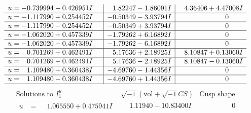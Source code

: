 \documentclass[1p]{elsarticle_modified}
\theoremstyle{definition}
\newcommand{\I}{\sqrt{-1}}
\begin{document}
$$\begin{array}{c|c|c}
\begin{aligned}
u &= -0.739994 - 0.426951 I\end{aligned}
 & \phantom{-}1.82247 - 1.86091 I & \phantom{-}4.36406 + 4.47008 I \\ \hline\begin{aligned}
u &= -1.117990 + 0.254452 I\end{aligned}
 & -0.50349 - 3.93794 I & \phantom{-0.000000 } 0 \\ \hline\begin{aligned}
u &= -1.117990 - 0.254452 I\end{aligned}
 & -0.50349 + 3.93794 I & \phantom{-0.000000 } 0 \\ \hline\begin{aligned}
u &= -1.062020 + 0.457339 I\end{aligned}
 & -1.79262 + 6.16892 I & \phantom{-0.000000 } 0 \\ \hline\begin{aligned}
u &= -1.062020 - 0.457339 I\end{aligned}
 & -1.79262 - 6.16892 I & \phantom{-0.000000 } 0 \\ \hline\begin{aligned}
u &= \phantom{-}0.701269 + 0.462491 I\end{aligned}
 & \phantom{-}5.17636 + 2.18925 I & \phantom{-}8.10847 + 0.13060 I \\ \hline\begin{aligned}
u &= \phantom{-}0.701269 - 0.462491 I\end{aligned}
 & \phantom{-}5.17636 - 2.18925 I & \phantom{-}8.10847 - 0.13060 I \\ \hline\begin{aligned}
u &= \phantom{-}1.109480 + 0.360438 I\end{aligned}
 & -4.69760 - 1.44356 I & \phantom{-0.000000 } 0 \\ \hline\begin{aligned}
u &= \phantom{-}1.109480 - 0.360438 I\end{aligned}
 & -4.69760 + 1.44356 I & \phantom{-0.000000 } 0\\
 \hline 
 \end{array}$$\newpage$$\begin{array}{c|c|c}  
\text{Solutions to }I^u_{1}& \I (\text{vol} + \sqrt{-1}CS) & \text{Cusp shape}\\
 \hline 
\begin{aligned}
u &= \phantom{-}1.065550 + 0.475941 I\end{aligned}
 & \phantom{-}1.11940 - 10.83400 I & \phantom{-0.000000 } 0 \\ \hline\begin{aligned}

\end{aligned}
\end{array}$$
\end{document}
